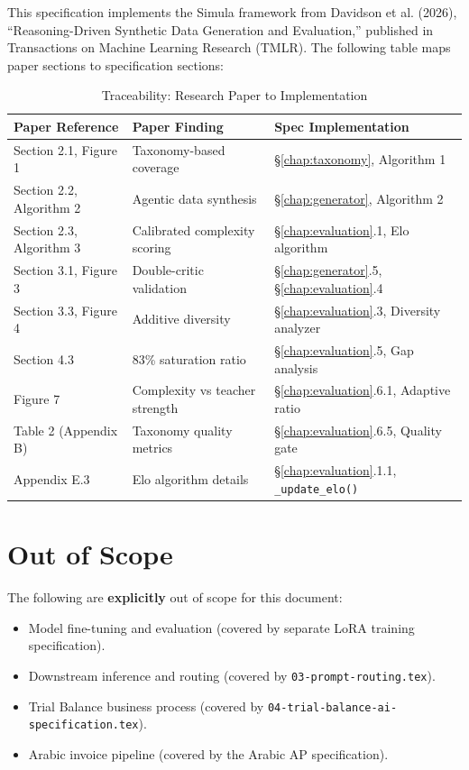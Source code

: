 This specification implements the Simula framework from Davidson et al. (2026),
``Reasoning-Driven Synthetic Data Generation and Evaluation,'' published in
Transactions on Machine Learning Research (TMLR). The following table maps
paper sections to specification sections:

\begin{table}[H]
\centering
\caption{Traceability: Research Paper to Implementation}
\label{tab:traceability}
\begin{tabularx}{\textwidth}{p{3.5cm}p{4cm}X}
\toprule
\textbf{Paper Reference} & \textbf{Paper Finding} & \textbf{Spec Implementation} \\
\midrule
Section 2.1, Figure 1 & Taxonomy-based coverage & §\ref{chap:taxonomy}, Algorithm 1 \\
Section 2.2, Algorithm 2 & Agentic data synthesis & §\ref{chap:generator}, Algorithm 2 \\
Section 2.3, Algorithm 3 & Calibrated complexity scoring & §\ref{chap:evaluation}.1, Elo algorithm \\
Section 3.1, Figure 3 & Double-critic validation & §\ref{chap:generator}.5, §\ref{chap:evaluation}.4 \\
Section 3.3, Figure 4 & Additive diversity & §\ref{chap:evaluation}.3, Diversity analyzer \\
Section 4.3 & 83\% saturation ratio & §\ref{chap:evaluation}.5, Gap analysis \\
Figure 7 & Complexity vs teacher strength & §\ref{chap:evaluation}.6.1, Adaptive ratio \\
Table 2 (Appendix B) & Taxonomy quality metrics & §\ref{chap:evaluation}.6.5, Quality gate \\
Appendix E.3 & Elo algorithm details & §\ref{chap:evaluation}.1.1, \texttt{\_update\_elo()} \\
\bottomrule
\end{tabularx}
\end{table}

\section{Out of Scope}

The following are \textbf{explicitly} out of scope for this document:

\begin{itemize}[nosep]
    \item Model fine-tuning and evaluation (covered by separate LoRA training specification).
    \item Downstream inference and routing (covered by \texttt{03-prompt-routing.tex}).
    \item Trial Balance business process (covered by \texttt{04-trial-balance-ai-specification.tex}).
    \item Arabic invoice pipeline (covered by the Arabic AP specification).
\end{itemize}

\newpage
